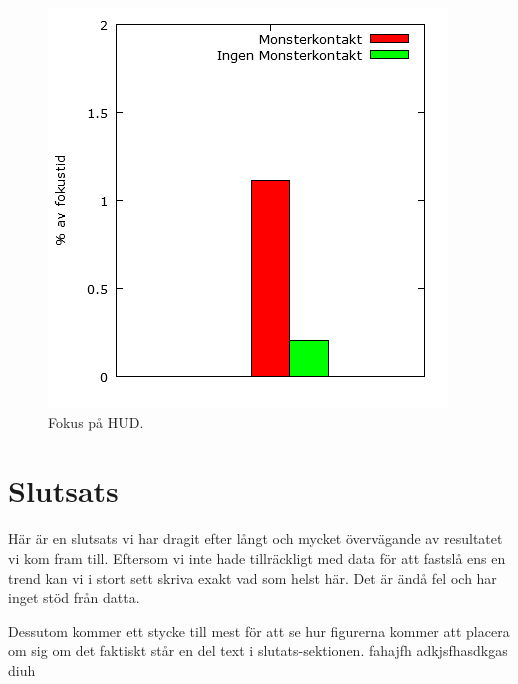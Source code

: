 \documentclass{article}
\begin{document}
\begin{figure}[h!]
    \begin{center}
        \includegraphics*[width=0.50\columnwidth]{experiment/bars.png}
        \caption{Fokus på HUD.}
        \label{bars}
    \end{center}
\end{figure}

\section{Slutsats}

Här är en slutsats vi har dragit efter långt och mycket övervägande av resultatet vi kom fram till. Eftersom vi inte hade tillräckligt med data för att fastslå ens en trend kan vi i stort sett skriva exakt vad som helst här. Det är ändå fel och har inget stöd från datta.

Dessutom kommer ett stycke till mest för att se hur figurerna kommer att placera om sig om det faktiskt står en del text i slutats-sektionen. fahajfh adkjsfhasdkgas diuh



\end{document}
